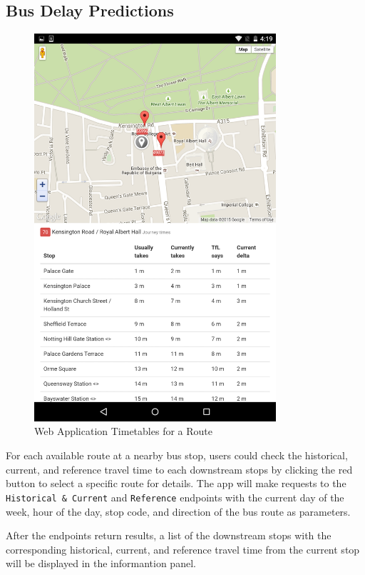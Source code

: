 \subsection{Bus Delay Predictions}
\begin{figure}
\centering
\includegraphics[width=0.8\textwidth]{figures/timetables.png}
\caption{\label{fig:timetable_view} Web Application Timetables for a Route}
\end{figure}

\par For each available route at a nearby bus stop, users could check the historical, current, and reference travel time to each downstream stops by clicking the red button to select a specific route for details. The app will make requests to the \texttt{Historical \& Current} and \texttt{Reference} endpoints with the current day of the week, hour of the day, stop code, and direction of the bus route as parameters.


\par After the endpoints return results, a list of the downstream stops with the corresponding historical, current, and reference travel time from the current stop will be displayed in the informantion panel.


